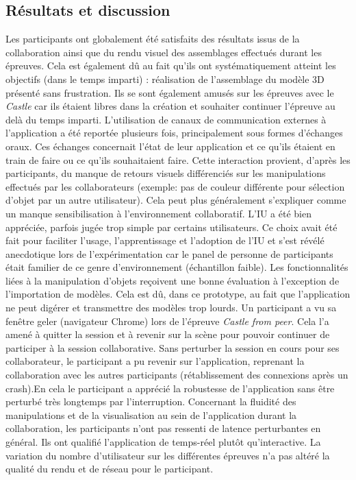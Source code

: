 \subsection{Résultats et discussion}
Les participants ont globalement été satisfaits des résultats issus de la 
collaboration ainsi que du rendu visuel des assemblages effectués durant les 
épreuves. Cela est également dû au fait qu'ils ont systématiquement atteint les 
objectifs (dans le temps imparti) : réalisation de l'assemblage du modèle 3D 
présenté sans frustration. Ils se sont également \og amusés\fg{} sur les épreuves
avec le \textit{Castle} car ils étaient libres dans la création et souhaiter continuer 
l'épreuve au delà du temps imparti. L'utilisation de canaux de communication 
externes à l'application a été reportée plusieurs fois, principalement sous formes 
d'échanges oraux. Ces échanges concernait l'état de leur application et ce qu'ils 
étaient en train de faire ou ce qu'ils souhaitaient faire. Cette interaction provient, 
d'après les participants, du manque de retours visuels différenciés sur les 
manipulations effectués par les collaborateurs (exemple: pas de couleur différente 
pour sélection d'objet par un autre utilisateur). Cela peut plus généralement 
s'expliquer comme un manque sensibilisation à l'environnement collaboratif. 
L'\gls{IU} a été bien appréciée, parfois jugée \og trop simple\fg{} par certains 
utilisateurs. Ce choix avait été fait pour faciliter l'usage, l'apprentissage et 
l'adoption de l'\gls{IU} et s'est révélé anecdotique lors de l'expérimentation car le 
panel de personne de participants était familier de ce genre 
d'environnement (échantillon faible).
Les fonctionnalités liées à la manipulation d'objets reçoivent une bonne évaluation 
à l'exception de l'importation de modèles. Cela est dû, dans ce prototype, au 
fait que l'application ne peut digérer et transmettre des modèles trop lourds. Un 
participant a vu sa fenêtre \og geler\fg{} (navigateur Chrome) lors de l'épreuve 
\textit{Castle from peer}. Cela l'a amené à quitter la session et à revenir sur la 
scène pour pouvoir continuer de participer à la session collaborative. Sans 
perturber la session en cours pour ses collaborateur, le participant a pu revenir sur 
l'application, reprenant la collaboration avec les autres participants (rétablissement 
des connexions après un crash).En cela le participant a apprécié la robustesse de 
l'application sans être perturbé très longtemps par l'interruption.
Concernant la fluidité des manipulations et de la visualisation au sein de 
l'application durant la collaboration, les participants n'ont pas ressenti de latence 
perturbantes en général. Ils ont qualifié l'application de temps-réel plutôt 
qu'interactive. La variation du nombre d'utilisateur sur les différentes épreuves n'a 
pas altéré la qualité du rendu et de réseau pour le participant.

